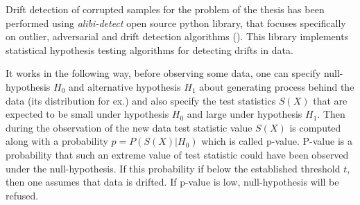 Drift detection of corrupted samples for the problem of the thesis has been performed using \textit{alibi-detect} open source python library, that focuses specifically on outlier, adversarial and drift detection algorithms (\cite{alibi-detect}). This library implements statistical hypothesis testing algorithms for detecting drifts in data. 

It works in the following way, before observing some data, one can specify null-hypothesis $H_0$ and alternative hypothesis $H_1$ about generating process behind the data (its distribution for ex.) and also specify the test statistics $S(X)$ that are expected to be small under hypothesis $H_0$ and large under hypothesis $H_1$. Then during the observation of the new data test statistic value $S(X)$ is computed along with a probability $p = P(S(X)|H_0)$ which is called p-value. P-value is a probability that such an extreme value of test statistic could have been observed under the null-hypothesis. If this probability if below the established threshold $t$, then one assumes that data is drifted. If p-value is low, null-hypothesis will be refused. 

